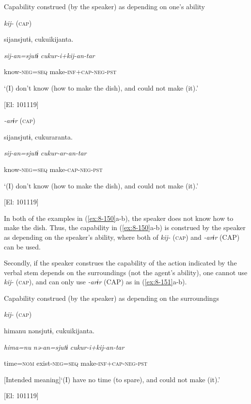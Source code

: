 \ea\label{ex:8-150}
  Capability construed (by the speaker) as depending on one’s ability

\ea \textit{kij-} (\textsc{cap})

  {\TM}
\glll  sijansjutɨ,  cukuikijanta.

    \textit{sij-an=sjutɨ}  \textit{cukur-i+kij{}-an-tar}

    know-\textsc{neg}=\textsc{seq}  make-\textsc{inf}+\textsc{cap}-\textsc{neg}-\textsc{pst}

    ‘(I) don’t know (how to make the dish), and could not make (it).’

    [El: 101119]

\ex \textit{{}-arɨr} (\textsc{cap})

  {\TM}
\glll  sijansjutɨ,  cukuraranta.

    \textit{sij-an=sjutɨ}  \textit{cukur-ar{}-an-tar}

    know-\textsc{neg}=\textsc{seq}  make-\textsc{cap}-\textsc{neg}-\textsc{pst}

    ‘(I) don’t know (how to make the dish), and could not make (it).’

    [El: 101119]

In both of the examples in (\ref{ex:8-150}a-b), the speaker does not know how to make the dish. Thus, the capability in (\ref{ex:8-150}a-b) is construed by the speaker as depending on the speaker’s ability, where both of \textit{kij-} (\textsc{cap}) and \textit{{}-arɨr} (CAP) can be used.

Secondly, if the speaker construes the capability of the action indicated by the verbal stem depends on the surroundings (not the agent’s ability), one cannot use \textit{kij-} (\textsc{cap}), and can only use \textit{{}-arɨr} (CAP) as in (\ref{ex:8-151}a-b).

\ea\label{ex:8-151}
  Capability construed (by the speaker) as depending on the surroundings

\ea \textit{kij-} (\textsc{cap})

  {\TM}
\glll  *himanu  nənsjutɨ,  cukuikijanta.

    \textit{hima=nu}  \textit{nə-an=sjutɨ}  \textit{cukur-i+kij{}-an-tar}

    time=\textsc{nom}  exist-\textsc{neg}=\textsc{seq}  make-\textsc{inf}+\textsc{cap}-\textsc{neg}-\textsc{pst}

    [Intended meaning]‘(I) have no time (to spare), and could not make (it).’

    [El: 101119]

